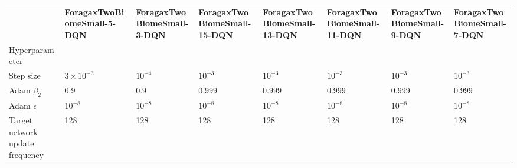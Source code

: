 \begin{tabular}{llllllll}
 & \bfseries ForagaxTwoBiomeSmall-5-DQN & \bfseries ForagaxTwoBiomeSmall-3-DQN & \bfseries ForagaxTwoBiomeSmall-15-DQN & \bfseries ForagaxTwoBiomeSmall-13-DQN & \bfseries ForagaxTwoBiomeSmall-11-DQN & \bfseries ForagaxTwoBiomeSmall-9-DQN & \bfseries ForagaxTwoBiomeSmall-7-DQN \\
Hyperparameter &  &  &  &  &  &  &  \\
Step size & $3 \times 10^{-3}$ & $10^{-4}$ & $10^{-3}$ & $10^{-3}$ & $10^{-3}$ & $10^{-3}$ & $10^{-3}$ \\
Adam $\beta_2$ & 0.9 & 0.9 & 0.999 & 0.999 & 0.999 & 0.999 & 0.999 \\
Adam $\epsilon$ & $10^{-8}$ & $10^{-8}$ & $10^{-8}$ & $10^{-8}$ & $10^{-8}$ & $10^{-8}$ & $10^{-8}$ \\
Target network update frequency & 128 & 128 & 128 & 128 & 128 & 128 & 128 \\
\end{tabular}
